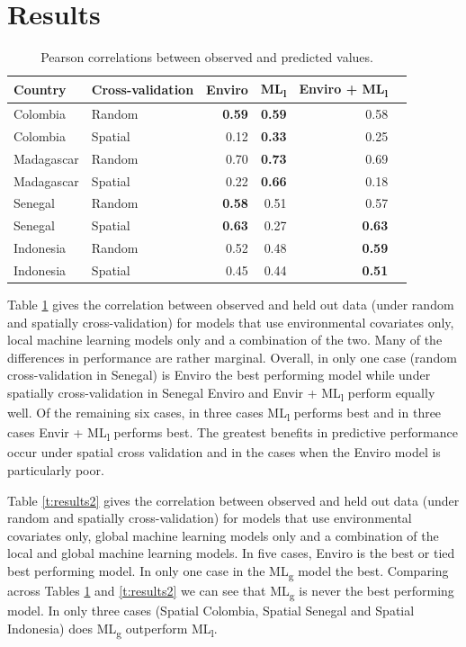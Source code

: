 \documentclass[11pt]{article}
\begin{document}
\section{Results}


\begin{table}[t!]
\caption{Pearson correlations between observed and predicted values. }
\centering
\begin{tabular}{llrrrr}
Country &  Cross-validation & Enviro &  ML\textsubscript{l} &  Enviro + ML\textsubscript{l} \\
\hline 
 Colombia & Random &  \textbf{0.59} & \textbf{0.59} & 0.58 \\
 Colombia &  Spatial &  0.12 &  \textbf{0.33} &  0.25\\
 Madagascar & Random &   0.70 &  \textbf{0.73} & 0.69 \\
 Madagascar &  Spatial &  0.22 &  \textbf{0.66} & 0.18\\
 Senegal &  Random &  \textbf{0.58} &  0.51 & 0.57 \\
 Senegal &  Spatial &  \textbf{0.63} &  0.27 &  \textbf{0.63} \\
 Indonesia &  Random &  0.52 &  0.48 &  \textbf{0.59} \\
 Indonesia &  Spatial &  0.45 &  0.44 &  \textbf{0.51} \\
\end{tabular}
\label{t:results}
\end{table}



Table \ref{t:results} gives the correlation between observed and held out data (under random and spatially cross-validation) for models that use environmental covariates only, local machine learning models only and a combination of the two.
Many of the differences in performance are rather marginal.
Overall, in only one case (random cross-validation in Senegal) is Enviro the best performing model while under spatially cross-validation in Senegal Enviro and Envir + ML\textsubscript{l} perform equally well.
Of the remaining six cases, in three cases ML\textsubscript{l} performs best and in three cases Envir + ML\textsubscript{l} performs best.
The greatest benefits in predictive performance occur under spatial cross validation and in the cases when the Enviro model is particularly poor.

Table \ref{t:results2} gives the correlation between observed and held out data (under random and spatially cross-validation) for models that use environmental covariates only, global machine learning models only and a combination of the local and global machine learning models.
In five cases, Enviro is the best or tied best performing model.
In only one case in the ML\textsubscript{g} model the best.
Comparing across Tables \ref{t:results} and \ref{t:results2} we can see that ML\textsubscript{g} is never the best performing model.
In only three cases (Spatial Colombia, Spatial Senegal and Spatial Indonesia) does ML\textsubscript{g} outperform ML\textsubscript{l}.
\end{document}
